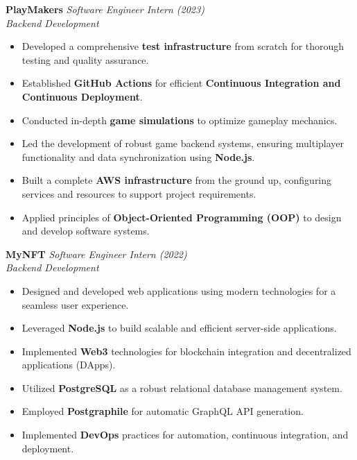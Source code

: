 \documentclass[10pt]{article}
\begin{document}
\noindent\textbf{PlayMakers} \hfill \textit{Software Engineer Intern (2023)} \\
\textit{Backend Development}
\begin{itemize}[leftmargin=*,label=\tiny$\bullet$]
    \item Developed a comprehensive \textbf{test infrastructure} from scratch for thorough testing and quality assurance.
    \item Established \textbf{GitHub Actions} for efficient \textbf{Continuous Integration and Continuous Deployment}.
    \item Conducted in-depth \textbf{game simulations} to optimize gameplay mechanics.
    \item Led the development of robust game backend systems, ensuring multiplayer functionality and data synchronization using \textbf{Node.js}.
    \item Built a complete \textbf{AWS infrastructure} from the ground up, configuring services and resources to support project requirements.
    \item Applied principles of \textbf{Object-Oriented Programming (OOP)} to design and develop software systems.
\end{itemize}
\vspace{0.5em}

\noindent\textbf{MyNFT} \hfill \textit{Software Engineer Intern (2022)} \\
\textit{Backend Development}
\begin{itemize}[leftmargin=*,label=\tiny$\bullet$]
    \item Designed and developed web applications using modern technologies for a seamless user experience.
    \item Leveraged \textbf{Node.js} to build scalable and efficient server-side applications.
    \item Implemented \textbf{Web3} technologies for blockchain integration and decentralized applications (DApps).
    \item Utilized \textbf{PostgreSQL} as a robust relational database management system.
    \item Employed \textbf{Postgraphile} for automatic GraphQL API generation.
    \item Implemented \textbf{DevOps} practices for automation, continuous integration, and deployment.
\end{itemize}
\vspace{0.5em}
\end{document}
